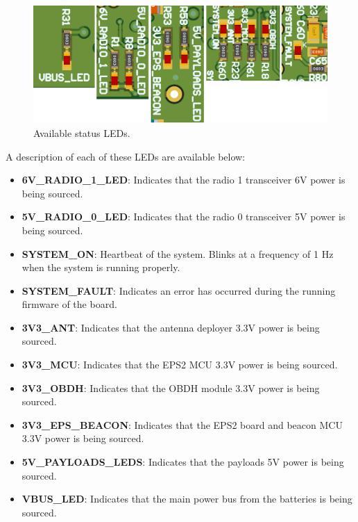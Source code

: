 \begin{figure}[!ht]
    \begin{center}
        \includegraphics[width=\textwidth]{figures/status_leds.png}
        \caption{Available status LEDs.}
        \label{fig:status-leds}
    \end{center}
\end{figure}

A description of each of these LEDs are available below:

\begin{itemize}
    \item \textbf{6V\_RADIO\_1\_LED}: Indicates that the radio 1 transceiver 6V power is being sourced.
    \item \textbf{5V\_RADIO\_0\_LED}: Indicates that the radio 0 transceiver 5V power is being sourced.
    \item \textbf{SYSTEM\_ON}: Heartbeat of the system. Blinks at a frequency of 1 Hz when the system is running properly.
    \item \textbf{SYSTEM\_FAULT}: Indicates an error has occurred during the running firmware of the board.
    \item \textbf{3V3\_ANT}: Indicates that the antenna deployer 3.3V power is being sourced.
    \item \textbf{3V3\_MCU}: Indicates that the EPS2 MCU 3.3V power is being sourced.
    \item \textbf{3V3\_OBDH}: Indicates that the OBDH module 3.3V power is being sourced.
    \item \textbf{3V3\_EPS\_BEACON}: Indicates that the EPS2 board and beacon MCU 3.3V power is being sourced.
    \item \textbf{5V\_PAYLOADS\_LEDS}: Indicates that the payloads 5V power is being sourced.
    \item \textbf{VBUS\_LED}: Indicates that the main power bus from the batteries is being sourced.
\end{itemize}

